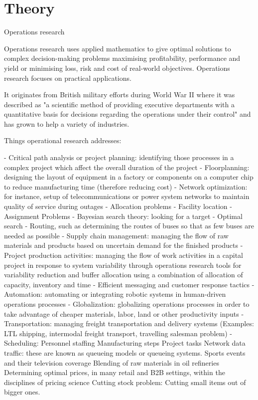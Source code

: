\chapter{Theory}
Operations research

Operations research uses applied mathematics to give optimal solutions to complex decision-making problems maximising profitability, performance and yield or minimising loss, risk and cost of real-world objectives.  Operations research focuses on practical applications.

It originates from British military efforts during World War II where it was described as "a scientific method of providing executive departments with a quantitative basis for decisions regarding the operations under their control" and has grown to help a variety of industries. 

Things operational research addresses:

- Critical path analysis or project planning: identifying those processes in a complex project which affect the overall duration of the project
- Floorplanning: designing the layout of equipment in a factory or components on a computer chip to reduce manufacturing time (therefore reducing cost)
- Network optimization: for instance, setup of telecommunications or power system networks to maintain quality of service during outages
- Allocation problems
- Facility location
- Assignment Problems
- Bayesian search theory: looking for a target
- Optimal search
- Routing, such as determining the routes of buses so that as few buses are needed as possible
- Supply chain management: managing the flow of raw materials and products based on uncertain demand for the finished products
- Project production activities: managing the flow of work activities in a capital project in response to system variability through operations research tools for variability reduction and buffer allocation using a combination of allocation of capacity, inventory and time
- Efficient messaging and customer response tactics
- Automation: automating or integrating robotic systems in human-driven operations processes
- Globalization: globalizing operations processes in order to take advantage of cheaper materials, labor, land or other productivity inputs
- Transportation: managing freight transportation and delivery systems (Examples: LTL shipping, intermodal freight transport, travelling salesman problem)
- Scheduling: Personnel staffing Manufacturing steps
Project tasks
Network data traffic: these are known as queueing models or queueing systems.
Sports events and their television coverage
Blending of raw materials in oil refineries
Determining optimal prices, in many retail and B2B settings, within the disciplines of pricing science
Cutting stock problem: Cutting small items out of bigger ones.

